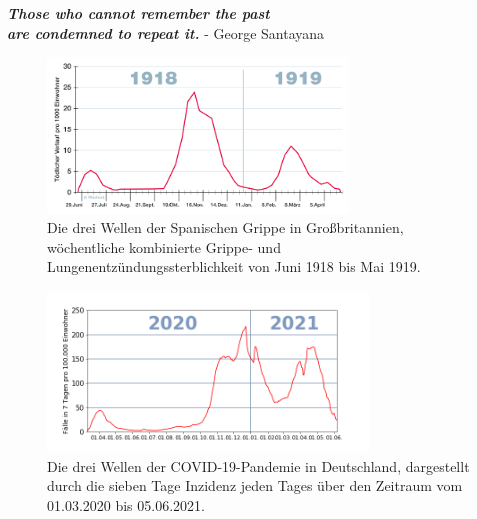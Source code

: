 \vspace*{15pt}
\begin{center}
    \huge{\textbf{
    \textit{Those who cannot remember the past\\ are condemned to repeat it.}}}
    \large{- George Santayana \autocite{history-quoteSantayana}}
\end{center}
\vspace*{65pt}
\begin{figure}[h]
    \centering
    \includegraphics[width=0.71\textwidth]{figures/Spanische_Grippe_1918_1919_GB.svg.png}
    \caption{Die drei Wellen der \glqq{}Spanischen Grippe\grqq{} in Großbritannien, wöchentliche kombinierte Grippe- und Lungenentzündungssterblichkeit von Juni 1918 bis Mai 1919. \autocite{spanischflu}}
    \label{fig:spanishflu}
\end{figure}

\begin{figure}[h]
    \centering
    \includegraphics[width=0.76\textwidth]{figures/Inzidenz Deutschland.png}
    \caption{Die drei Wellen der COVID-19-Pandemie in Deutschland, dargestellt durch die sieben Tage Inzidenz jeden Tages über den Zeitraum vom 01.03.2020 bis 05.06.2021.}
    \label{fig:germany_incidence}
\end{figure}
